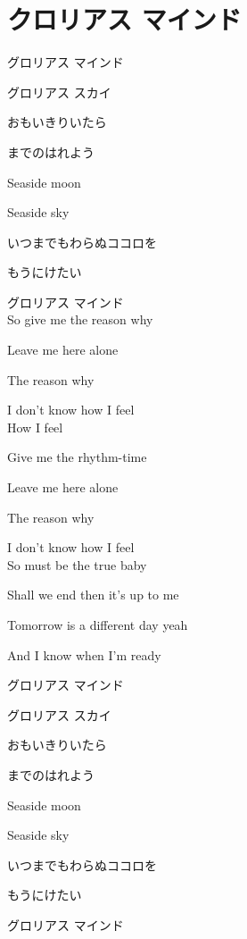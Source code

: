 \section{ クロリアス マインド}

\large{

グロリアス マインド　

グロリアス スカイ

おもいきりいたら

までのはれよう

Seaside moon　

Seaside sky

いつまでもわらぬココロを

もうにけたい

グロリアス マインド
\\

So give me the reason why

Leave me here alone

The reason why

I don't know how I feel
\\

How I feel

Give me the rhythm-time

Leave me here alone

The reason why

I don't know how I feel
\\

So must be the true baby

Shall we end then it's up to me

Tomorrow is a different day yeah

And I know when I'm ready
\\


グロリアス マインド　

グロリアス スカイ

おもいきりいたら

までのはれよう

Seaside moon　

Seaside sky

いつまでもわらぬココロを

もうにけたい

グロリアス マインド

}